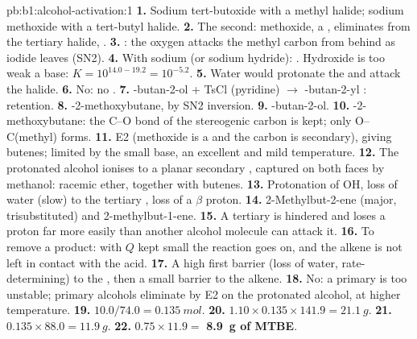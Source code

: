 \begin{solution}{pb:b1:alcohol-activation:1}
\textbf{1.} Sodium tert-butoxide with a methyl halide; sodium methoxide with
a tert-butyl halide.
\textbf{2.} The second: methoxide, a , eliminates from the
tertiary halide, .
\textbf{3.} : the  oxygen
attacks the methyl carbon from behind as iodide leaves (SN2).
\textbf{4.} With sodium (or sodium hydride): . Hydroxide is too weak a base: $K = 10^{14.0 -
19.2} = 10^{-5.2}$.
\textbf{5.} Water would protonate the  and attack the halide.
\textbf{6.} No: no .
\textbf{7.} -butan-2-ol + TsCl (pyridine) $\to$ -butan-2-yl
: retention.
\textbf{8.} -2-methoxybutane, by SN2 inversion.
\textbf{9.} -butan-2-ol.
\textbf{10.} -2-methoxybutane: the C--O bond of the stereogenic
carbon is kept; only O--C(methyl) forms.
\textbf{11.} E2 (methoxide is a  and the carbon is secondary),
giving butenes; limited by the small base, an excellent  and
mild temperature.
\textbf{12.} The protonated alcohol ionises to a planar secondary
, captured on both faces by methanol: racemic ether, together
with butenes.
\textbf{13.} Protonation of OH, loss of water (slow) to the tertiary
, loss of a $\beta$ proton.
\textbf{14.} 2-Methylbut-2-ene (major, trisubstituted) and
2-methylbut-1-ene.
\textbf{15.} A tertiary  is hindered and loses a proton far
more easily than another alcohol molecule can attack it.
\textbf{16.} To remove a product: with $Q$ kept small the reaction goes on,
and the alkene is not left in contact with the acid.
\textbf{17.} A high first barrier (loss of water, rate-determining) to the
, then a small barrier to the alkene.
\textbf{18.} No: a primary  is too unstable; primary alcohols
eliminate by E2 on the protonated alcohol, at higher temperature.
\textbf{19.} $10.0/74.0 = \qty{0.135}{mol}$.
\textbf{20.} $1.10 \times 0.135 \times 141.9 = \qty{21.1}{g}$.
\textbf{21.} $0.135 \times 88.0 = \qty{11.9}{g}$.
\textbf{22.} $0.75 \times 11.9 =$ \textbf{\qty{8.9}{g} of MTBE}.
\end{solution}
